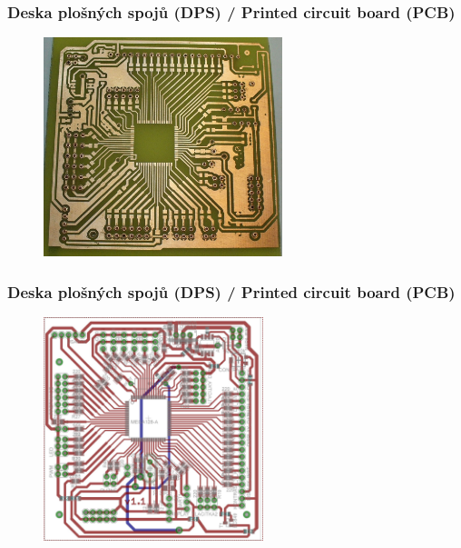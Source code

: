 \documentclass[12;pt,t]{beamer} %
\begin{document}
\begin{frame}
\frametitle{Deska plošných spojů (DPS) / Printed circuit board (PCB)}    	
\begin{figure}[H]
	\includegraphics[width=0.62\textwidth]{img/dps_cesty.jpg}
\end{figure}
\end{frame}


\begin{frame}
\frametitle{Deska plošných spojů (DPS) / Printed circuit board (PCB)}    	
\begin{figure}[H]
	\includegraphics[width=0.57\textwidth]{img/transmit_b.jpg}
\end{figure}
\end{frame}
\end{document}
